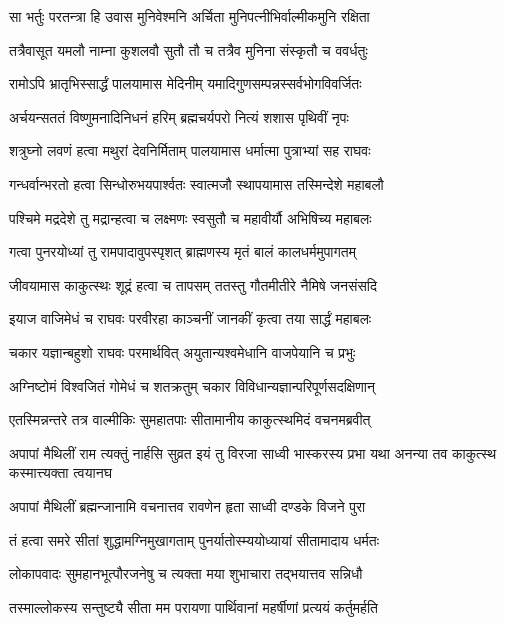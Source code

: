 \twolineshloka
{सा भर्तुः परतन्त्रा हि उवास मुनिवेश्मनि}
{अर्चिता मुनिपत्नीभिर्वाल्मीकमुनि रक्षिता}%

\twolineshloka
{तत्रैवासूत यमलौ नाम्ना कुशलवौ सुतौ}
{तौ च तत्रैव मुनिना संस्कृतौ च ववर्धतुः}%

\twolineshloka
{रामोऽपि भ्रातृभिस्सार्द्धं पालयामास मेदिनीम्}
{यमादिगुणसम्पन्नस्सर्वभोगविवर्जितः}%

\twolineshloka
{अर्चयन्सततं विष्णुमनादिनिधनं हरिम्}
{ब्रह्मचर्यपरो नित्यं शशास पृथिवीं नृपः}%

\twolineshloka
{शत्रुघ्नो लवणं हत्वा मथुरां देवनिर्मिताम्}
{पालयामास धर्मात्मा पुत्राभ्यां सह राघवः}%

\twolineshloka
{गन्धर्वान्भरतो हत्वा सिन्धोरुभयपार्श्वतः}
{स्वात्मजौ स्थापयामास तस्मिन्देशे महाबलौ}%

\twolineshloka
{पश्चिमे मद्रदेशे तु मद्रान्हत्वा च लक्ष्मणः}
{स्वसुतौ च महावीर्यौ अभिषिच्य महाबलः}%

\twolineshloka
{गत्वा पुनरयोध्यां तु रामपादावुपस्पृशत्}
{ब्राह्मणस्य मृतं बालं कालधर्ममुपागतम्}%

\twolineshloka
{जीवयामास काकुत्स्थः शूद्रं हत्वा च तापसम्}
{ततस्तु गौतमीतीरे नैमिषे जनसंसदि}%

\twolineshloka
{इयाज वाजिमेधं च राघवः परवीरहा}
{काञ्चनीं जानकीं कृत्वा तया सार्द्धं महाबलः}%

\twolineshloka
{चकार यज्ञान्बहुशो राघवः परमार्थवित्}
{अयुतान्यश्वमेधानि वाजपेयानि च प्रभुः}%

\twolineshloka
{अग्निष्टोमं विश्वजितं गोमेधं च शतक्रतुम्}
{चकार विविधान्यज्ञान्परिपूर्णसदक्षिणान्}%

\twolineshloka
{एतस्मिन्नन्तरे तत्र वाल्मीकिः सुमहातपाः}
{सीतामानीय काकुत्स्थमिदं वचनमब्रवीत्}%



\threelineshloka
{अपापां मैथिलीं राम त्यक्तुं नार्हसि सुव्रत}
{इयं तु विरजा साध्वी भास्करस्य प्रभा यथा}
{अनन्या तव काकुत्स्थ कस्मात्त्यक्ता त्वयानघ}%


\twolineshloka
{अपापां मैथिलीं ब्रह्मन्जानामि वचनात्तव}
{रावणेन हृता साध्वी दण्डके विजने पुरा}%

\twolineshloka
{तं हत्वा समरे सीतां शुद्धामग्निमुखागताम्}
{पुनर्यातोस्म्ययोध्यायां सीतामादाय धर्मतः}%

\twolineshloka
{लोकापवादः सुमहानभूत्पौरजनेषु च}
{त्यक्ता मया शुभाचारा तद्भयात्तव सन्निधौ}%

\twolineshloka
{तस्माल्लोकस्य सन्तुष्ट्यै सीता मम परायणा}
{पार्थिवानां महर्षीणां प्रत्ययं कर्तुमर्हति}%

